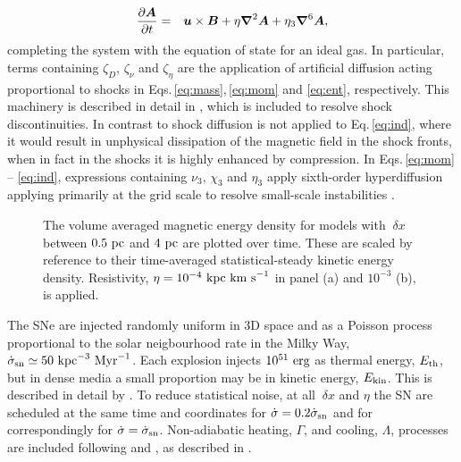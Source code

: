 \documentclass[preprint2]{aastex63}
\newcommand\SNr{\dot\sigma_{\rm sn}}
\newcommand\ESK{E_{\rm kin}}
\newcommand\EST{E_{\rm th}}
\newcommand{\vect}[1]{{{\mbox{\boldmath $#1$}}}}%
\newcommand\kpc{~ {\rm kpc}}
\newcommand\pc{~ {\rm pc}}
\newcommand\dx{~ {\delta x}}
\newcommand\Myr{~ {\rm Myr}}
\newcommand\erg{~ {\rm erg}}
\newcommand\kms{~ {\rm km~ s}^{-1}}
\begin{document}
  \begin{eqnarray}
  \label{eq:ind}
    \frac{\partial \vect{A}}{\partial t} &=&
    \vect{u}\times\vect{B}
    +\eta\vect\nabla^2\vect{A}
    +\eta_3\vect\nabla^6\vect{A},
  \end{eqnarray}
completing the system with the equation of state for an ideal gas.
In particular, terms containing $\zeta_D,\,\zeta_\nu$ and $\zeta_\eta$ are the
application of artificial diffusion acting proportional to shocks in 
Eqs.\,\eqref{eq:mass},\,\eqref{eq:mom} and \eqref{eq:ent}, respectively.
This machinery is described in detail in \citet{GMKSH20}, which is included to
resolve shock discontinuities.
In contrast to \citet{Gent:2013b} shock diffusion is not applied to
Eq.\,\eqref{eq:ind}, where it would result in unphysical dissipation of the
magnetic field in the shock fronts, when in fact in the shocks it is highly
enhanced by compression.
In Eqs.\,\eqref{eq:mom} -- \eqref{eq:ind}, expressions containing 
$\nu_3,\,\chi_3$ and $\eta_3$ apply sixth-order hyperdiffusion applying
primarily at the grid scale to resolve small-scale instabilities
\citep[see, e.g.,][]{ABGS02,HB04}.

\begin{figure*}
\caption{
The volume averaged magnetic energy density for models with $\dx$ between
$0.5\pc$ and $4\pc$ are plotted over time.
These are scaled by reference to their time-averaged statistical-steady kinetic
energy density.
Resistivity, $\eta=10^{-4}\kpc\kms$ in panel {\rm(a)} and $10^{-3}$ {\rm(b)}, is
applied.
\label{fig:eb-res}}
\end{figure*}

The SNe are injected randomly uniform in 3D space and as a Poisson
process proportional to the solar neigbourhood rate in the Milky Way,
 $\SNr\simeq 50\kpc^{-3}\Myr^{-1}$.
Each explosion injects $10^{51}\erg$ as thermal energy, $\EST$, but in dense
media a small proportion may be in kinetic energy, $\ESK$.
This is described in detail by \citet{GMKSH20}.
To reduce statistical noise, at all $\dx$ and $\eta$ the SN are
scheduled at the same time and coordinates for $\dot\sigma=0.2\SNr$ and for 
correspondingly for $\dot\sigma=\SNr$.
Non-adiabatic heating, $\Gamma$, and cooling, $\Lambda$, processes are included
following \citet{Wolfire:1995} and \citet{Sarazin:1987}, as described in 
\citet{Gent:2013a}.
\end{document}

